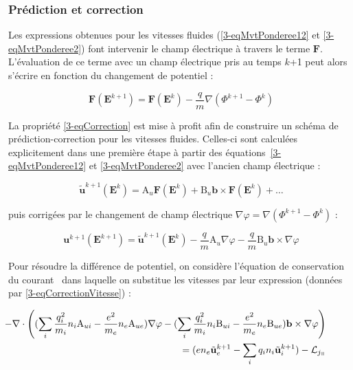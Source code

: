 \begin{refsection}
\subsubsection{Prédiction et correction}

Les expressions obtenues pour les vitesses
fluides (\eqref{3-eqMvtPonderee12} et \eqref{3-eqMvtPonderee2}) font intervenir
le champ électrique à travers le terme $\mathbf F$.
L'évaluation de ce terme avec un champ électrique pris au temps $k$+1 peut alors
s'écrire en fonction du changement de potentiel :

\begin{equation}
\label{3-eqCorrection}
\mathbf F(\mathbf E^{k+1}) = \mathbf F(\mathbf E^{k})-\frac{q}{m}\nabla
(\Phi^{k+1}-\Phi^{k})
\end{equation}

La propriété \eqref{3-eqCorrection} est mise à profit afin de construire un
schéma de prédiction-correction pour les vitesses fluides. Celles-ci sont
calculées explicitement dans une première étape à partir des
équations~\eqref{3-eqMvtPonderee12} et \eqref{3-eqMvtPonderee2} avec 
l'ancien champ électrique :

\begin{equation}
\tilde{\mathbf u}^{k+1}(\mathbf{E}^k)=\text{A}_u\mathbf F(\mathbf E^{k}) +
\text{B}_u\mathbf b\times\mathbf F(\mathbf E^{k}) + \text{\ldots}
\end{equation}

puis corrigées par le changement de champ électrique
$\nabla\varphi=\nabla(\Phi^{k+1}-\Phi^k)$ :

\begin{equation}
\label{3-eqCorrectionVitesse}
\mathbf u^{k+1}(\mathbf{E}^{k+1}) = \tilde{\mathbf
u}^{k+1}(\mathbf{E}^k)-\frac{q}{m}\text{A}_u\nabla
\varphi-\frac{q}{m}\text{B}_u\mathbf b\times\nabla
\varphi
\end{equation}

Pour résoudre la différence de potentiel, on considère l'équation de
conservation du courant~ dans laquelle on substitue les
vitesses par leur expression (données par \eqref{3-eqCorrectionVitesse}) :

\begin{equation}
\begin{split}\mkern-60mu
\label{3-eqCourantCoefficient}
-\nabla\cdot\left((\sum_i\frac{q_i^2}{m_i}n_i\text{A}_{ui}-\frac{e^2}{m_e}n_e\text{A}_{ue})\nabla
\varphi-(\sum_i\frac{q_i^2}{m_i}n_i\text{B}_{ui}-\frac{e^2}{m_e}n_e\text{B}_{ue})\mathbf
b\times\nabla
\varphi\right)\\=(en_e\tilde{\mathbf
u}_e^{k+1}-\sum_iq_in_i\tilde{\mathbf u}_i^{k+1})-\mathcal L_{j_\para}
\end{split}
\end{equation}


\end{refsection}
